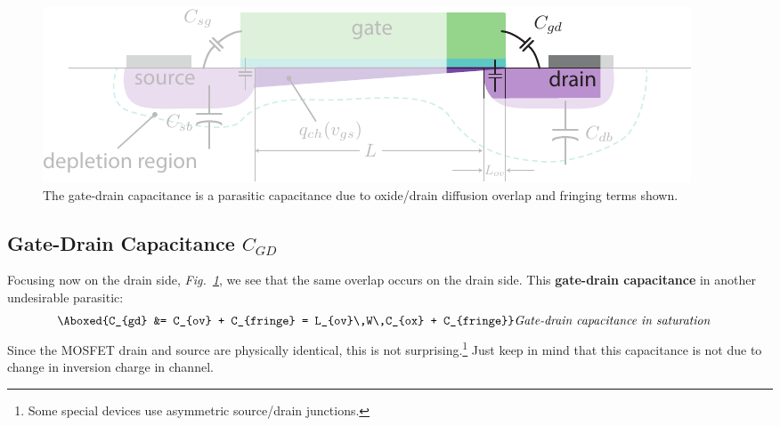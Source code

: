 \begin{figure}[t]
\centering
\includegraphics[width=\columnwidth]{mos_caps_Cgd}
\caption{The gate-drain capacitance is a parasitic capacitance due to oxide/drain diffusion overlap and fringing terms shown.}
\label{fig:mos_caps_Cgd}
\end{figure}
\subsection{Gate-Drain Capacitance \texorpdfstring{$C_{GD}$}{}}
Focusing now on the drain side, \emph{Fig.~\ref{fig:mos_caps_Cgd}}, we see that the same overlap occurs on the drain side.  This \textbf{gate-drain capacitance} in another undesirable parasitic:
    \begin{align}
        \Aboxed{C_{gd} &= C_{ov} + C_{fringe} = L_{ov}\,W\,C_{ox} + C_{fringe}} &\textit{Gate-drain capacitance in saturation}
    \end{align}
Since the MOSFET drain and source are physically identical, this is not surprising.\footnote{Some special devices use asymmetric source/drain junctions.}  Just keep in mind that this capacitance is not due to change in inversion charge in channel.
